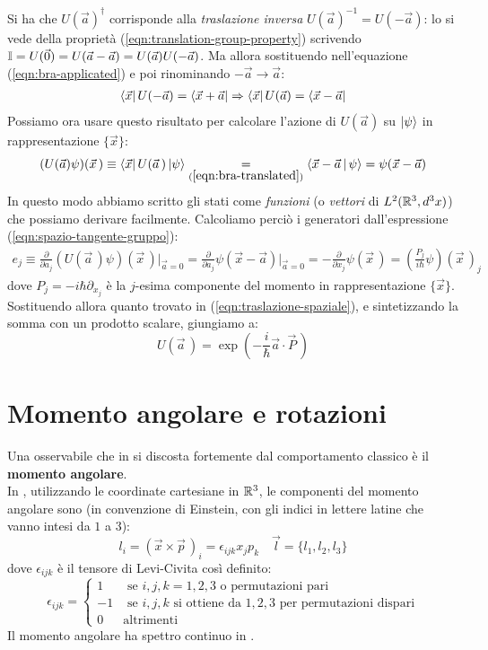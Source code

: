 \documentclass[../../FisicaTeorica.tex]{subfiles}
\begin{document}
Si ha che $U(\vec{a})^\dag$ corrisponde alla \textit{traslazione inversa} $U(\vec{a})^{-1} = U(-\vec{a})$: lo si vede della proprietà (\ref{eqn:translation-group-property}) scrivendo $\mathbb{I} = U(\vec{0})= U(\vec{a}-\vec{a})=U(\vec{a})U(-\vec{a})$. Ma allora sostituendo nell'equazione (\ref{eqn:bra-applicated}) e poi rinominando $-\vec{a}\to \vec{a}$:
\begin{align}
\Bra{\vec{x}}U(-\vec{a})=\Bra{\vec{x}+\vec{a}} \Rightarrow  \Bra{\vec{x}}U(\vec{a})=\Bra{\vec{x}-\vec{a}}
 \label{eqn:bra-translated}
\end{align}
Possiamo ora usare questo risultato per calcolare l'azione di $U(\vec{a})$ su $\Ket{\psi}$ in rappresentazione $\{\vec{x}\}$:
\begin{align*}
(U(\vec{a}) \psi)(\vec{x}\,) \equiv \Bra{\vec{x}}U(\vec{a}\,)\Ket{\psi} \underset{(\ref{eqn:bra-translated})}{=} \Braket{\vec{x}-\vec{a}|\psi} = \psi(\vec{x}-\vec{a})
\end{align*}
In questo modo abbiamo scritto gli stati come \textit{funzioni} (o \textit{vettori} di $L^2(\mathbb{R}^3,d^3x)$) che possiamo derivare facilmente. Calcoliamo perciò i generatori dall'espressione (\ref{eqn:spazio-tangente-gruppo}):
\begin{align*}
e_j \equiv \frac{\partial}{\partial a_j} (U(\vec{a}\,)\psi)(\vec{x}\,)\Big|_{\vec{a}=0} = \frac{\partial}{\partial a_j} \psi(\vec{x}-\vec{a})\Big|_{\vec{a}=0} = -\frac{\partial}{\partial x_j}\psi(\vec{x}\,)=\left(\frac{P_j}{i\hbar}\psi\right)(\vec{x}\,)_j
\end{align*}
dove $P_j = -i\hbar \partial_{x_j}$ è la $j$-esima componente del momento in rappresentazione $\{\vec{x}\}$.\\
Sostituendo allora quanto trovato in (\ref{eqn:traslazione-spaziale}), e sintetizzando la somma con un prodotto scalare, giungiamo a:
\[
U(\vec{a}\,)=\exp\left({-\frac{i}{\hbar}\vec{a}\cdot \vec{P}\,}\right)
\]

\section{Momento angolare e rotazioni}
\label{sec:rotazioni}
Una osservabile che in \MQ si discosta fortemente dal comportamento classico è il \textbf{momento angolare}.\\

In \MC, utilizzando le coordinate cartesiane in $\mathbb{R}^3$, le componenti del momento angolare sono (in convenzione di Einstein, con gli indici in lettere latine che vanno intesi da $1$ a $3$):
\[
l_i = (\vec{x}\times \vec{p}\,)_i= \epsilon_{ijk} x_j p_k \quad \vec{l}=\{l_1, l_2, l_3\}
\]
dove $\epsilon_{ijk}$ è il tensore di Levi-Civita così definito:
\[
\epsilon_{ijk}=\begin{cases}
1 & \text{ se } i,j,k = 1,2,3 \text{ o permutazioni pari}\\
-1 & \text{ se } i,j,k \text{ si ottiene da } 1,2,3 \text{ per permutazioni dispari}\\
0 & \text{altrimenti}
\end{cases}
\]
Il momento angolare ha spettro continuo in \MC.\\
\end{document}

